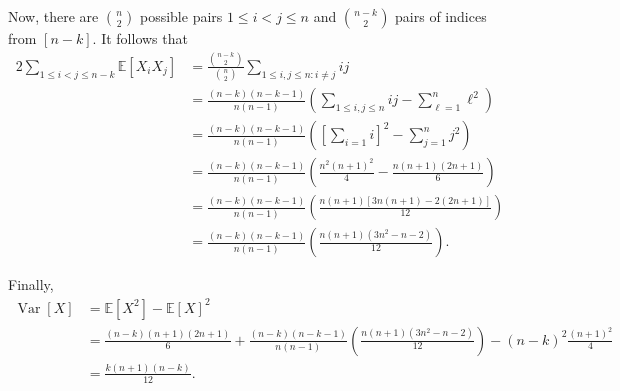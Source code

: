 \documentclass[10pt]{article}
\DeclareMathOperator{\Var}{Var}
\newcommand{\E}{\mathbb{E}}
\begin{document}
Now,
there are $\binom{n}{2}$ possible pairs $1\leq i< j\leq n$
and $\binom{n-k}2$ pairs of indices from $[n-k]$.
It follows that
\begin{align*}
  2 \sum_{1\leq i< j\leq n-k} \E[X_i X_j]
  &= \frac{\binom{n-k}2}{\binom{n}2} \sum_{1\leq i, j\leq n: i\neq j} ij \\
  &= \frac{(n-k)(n-k-1)}{n(n-1)} \left( \sum_{1\leq i, j\leq n} ij - \sum_{\ell=1}^n \ell^2  \right) \\
  &= \frac{(n-k)(n-k-1)}{n(n-1)} \left( \left[ \sum_{i=1} i \right]^2 - \sum_{j=1}^n j^2  \right) \\
  &= \frac{(n-k)(n-k-1)}{n(n-1)} \left( \frac{n^2(n+1)^2}4 - \frac{n(n+1)(2n+1)}6  \right) \\
  &= \frac{(n-k)(n-k-1)}{n(n-1)} \left( \frac{n(n+1)[3n(n+1) - 2(2n+1)]}{12}  \right) \\
  &= \frac{(n-k)(n-k-1)}{n(n-1)} \left( \frac{n(n+1)(3n^2-n-2)}{12} \right).
\end{align*}

Finally,
\begin{align*}
  \Var[X]
  &= \E[X^2] - \E[X]^2 \\
  &= \frac{(n-k)(n+1)(2n+1)}6
  + \frac{(n-k)(n-k-1)}{n(n-1)} \left( \frac{n(n+1)(3n^2-n-2)}{12} \right)
  - (n-k)^2 \frac{(n+1)^2}4 \\
  &= \boxed{\frac{k(n+1)(n-k)}{12}}.
\end{align*}

\clearpage
\section{}
\section{}
\section{}
\section{}
\end{document}
